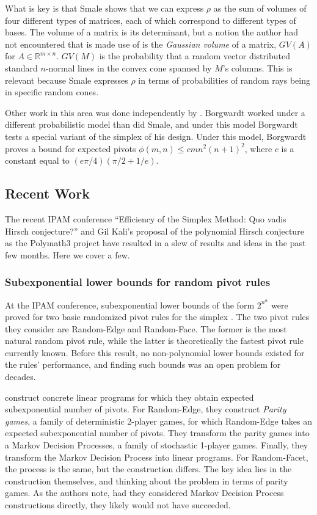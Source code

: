 \documentclass[11pt,a4paper]{article}
\theoremstyle{definition}
\begin{document}
What is key is that Smale shows that we can express $\rho$ as the sum of volumes of four different types of matrices, each of which correspond to different types of bases. The volume of a matrix is its determinant, but a notion the author had not encountered that is made use of is the \emph{Gaussian volume} of a matrix, $GV(A)$ for $A\in\mathbb{R}^{m\times n}$. $GV(M)$ is the probability that a random vector distributed standard $n$-normal lines in the convex cone spanned by $M$'s columns. This is relevant because Smale expresses $\rho $ in terms of probabilities of random rays being in specific random cones.

Other work in this area was done independently by \citet{borg82}. Borgwardt worked under a different probabilistic model than did Smale, and under this model Borgwardt tests a special variant of the simplex of his design. Under this model, Borgwardt proves a bound for expected pivots $\phi(m,n)\le cmn^2(n+1)^2$, where $c$ is a constant equal to $(e\pi/4)(\pi/2+1/e)$.

\subsection{Recent Work}

The recent IPAM conference ``Efficiency of the Simplex Method: Quo vadis Hirsch conjecture?'' and Gil Kali's proposal of the polynomial Hirsch conjecture as the Polymath3 project have resulted in a slew of results and ideas in the past few months. Here we cover a few.

\subsubsection{Subexponential lower bounds for random pivot rules}

At the IPAM conference, subexponential lower bounds of the form $2^{n^\alpha}$ were proved for two basic randomized pivot rules for the simplex \citet{free11}. The two pivot rules they consider are {\sc Random-Edge} and {\sc Random-Face}. The former is the most natural random pivot rule, while the latter is theoretically the fastest pivot rule currently known. Before this result, no non-polynomial lower bounds existed for the rules' performance, and finding such bounds was an open problem for decades. 

\citet{free11} construct concrete linear programs for which they obtain expected subexponential number of pivots. For {\sc Random-Edge}, they construct \emph{Parity games}, a family of deterministic 2-player games, for which {\sc Random-Edge} takes an expected subexponential number of pivots. They transform the parity games into a Markov Decision Processes, a family of stochastic 1-player games. Finally, they transform the Markov Decision Process into linear programs. For {\sc Random-Facet}, the process is the same, but the construction differs. The key idea lies in the construction themselves, and thinking about the problem in terms of parity games. As the authors note, had they considered Markov Decision Process constructions directly, they likely would not have succeeded.
\end{document}
